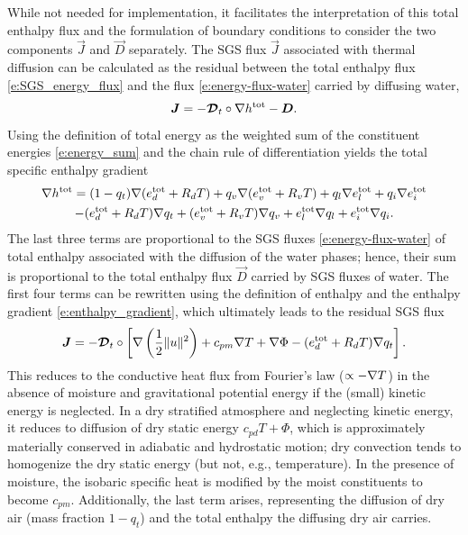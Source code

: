 \documentclass{report}
\begin{document}
While not needed for implementation, it facilitates the interpretation of this total enthalpy flux and the formulation of boundary conditions to consider the two components $\vec{J}$ and $\vec{D}$ separately. The SGS flux $\vec{J}$ associated with thermal diffusion can be calculated as the residual between the total enthalpy flux \eqref{e:SGS_energy_flux} and the flux \eqref{e:energy-flux-water} carried by diffusing water, 
\[
    \boldsymbol{{J}} = - \boldsymbol{{\mathcal{D}}}_t \circ \nabla h^{\mathrm{tot}} - \boldsymbol{{D}}.
\]
Using the definition of total energy as the weighted sum of the constituent energies \eqref{e:energy_sum} and the chain rule of differentiation yields the total specific enthalpy gradient
\begin{multline*}
\nabla h^{\mathrm{tot}}
= (1-q_t)\nabla (e_d^{\mathrm{tot}} + R_d T) + q_v \nabla (e_v^{\mathrm{tot}} + R_v T) + q_l \nabla e_l^{\mathrm{tot}} + q_i \nabla e_i^{\mathrm{tot}} \\
- (e_d^{\mathrm{tot}} + R_d T) \nabla q_t + (e_v^{\mathrm{tot}} + R_v T) \nabla q_v + e_l^{\mathrm{tot}}\nabla q_l + e_i^{\mathrm{tot}} \nabla q_i.
\end{multline*}
The last three terms are proportional to the SGS fluxes \eqref{e:energy-flux-water} of total enthalpy associated with the diffusion of the water phases; hence, their sum is proportional to the total enthalpy flux $\vec{D}$ carried by SGS fluxes of water. The first four terms can be rewritten using the definition of enthalpy and the enthalpy gradient \eqref{e:enthalpy_gradient}, which ultimately leads to the residual SGS flux
\begin{equation}\label{e:sgs_heat_flux}
\boldsymbol{{J}} = - \boldsymbol{{\mathcal{D}}}_t \circ \left[ \nabla \left( \frac{1}{2} \| u \|^2 \right) + c_{pm} \nabla T + \nabla \Phi - (e_d^{\mathrm{tot}} + R_d T) \nabla q_t \right].
\end{equation}
This reduces to the conductive heat flux from Fourier's law ($\propto -\nabla T$) in the absence of moisture and gravitational potential energy if the (small) kinetic energy is neglected. In a dry stratified atmosphere and neglecting kinetic energy, it reduces to diffusion of dry static energy $c_{pd} T + \Phi$, which is approximately materially conserved in adiabatic and hydrostatic motion; dry convection tends to homogenize the dry static energy (but not, e.g., temperature). In the presence of moisture, the isobaric specific heat is modified by the moist constituents to become $c_{pm}$. Additionally, the last term arises, representing the diffusion of dry air (mass fraction $1-q_t$) and the total enthalpy the diffusing dry air carries.
\end{document}
